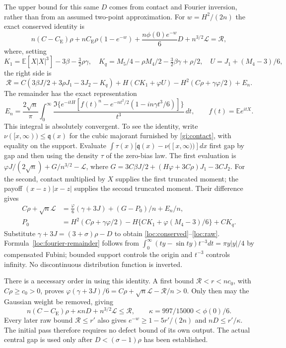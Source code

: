 \documentclass[aop,preprint]{imsart}
\theoremstyle{definition}
\newcommand{\CE}{C_{\mathrm E}}
\newcommand{\E}{\mathbb E}
\numberwithin{equation}{section}
\begin{document}
The upper bound for this same $D$ comes from contact and Fourier
inversion, rather than from an assumed two-point approximation.
For $w=H^2/(2n)$ the exact conserved identity is
\begin{equation}\label{loc:conserved}
 n(C-\CE)\rho+n\CE\rho(1-e^{-w})
 +\frac{n\phi(0)e^{-w}}6D+n^{3/2}\mathcal L=\mathcal R,
\end{equation}
where, setting
\[
 K_1=\E[X|X|^3]-3\beta-\tfrac32\rho\gamma,\quad
 K_q=M_5/4-\rho M_4/2-\tfrac32\beta\gamma+\rho/2,
 \quad U=J_1+(M_4-3)/6,
\]
the right side is
\begin{equation}\label{loc:raw}
 \mathcal R=C(3\beta J/2+3\rho J_1-3J_2-K_q)
 +H(CK_1+\varphi U)-H^2(C\rho+\gamma\varphi/2)+E_n.
\end{equation}
The remainder has the exact representation
\begin{equation}\label{loc:fourier-remainder}
 E_n=\frac{2\sqrt n}{\pi}\int_0^\infty
 \frac{\Im\{e^{-itH}[f(t)^n-e^{-nt^2/2}(1-in\gamma t^3/6)]\}}
 {t^3}\,dt,\qquad f(t)=\E e^{itX}.
\end{equation}
This integral is absolutely convergent.
To see the identity, write $\nu([x,\infty))\le\mathfrak q(x)$ for
the cubic majorant furnished by \eqref{gi:contact}, with equality on
the support. Evaluate
$\int\tau(x)[\mathfrak q(x)-\nu([x,\infty))]dx$ first gap by gap
and then using the density $\tau$ of the zero-bias law.
The first evaluation is
$\varphi J/(2\sqrt n)+G/n^{3/2}-\mathcal L$, where
$G=3C\beta J/2+(H\varphi+3C\rho)J_1-3CJ_2$.
For the second, contact multiplied by $X$ supplies the first truncated
moment; the payoff $(x-z)|x-z|$ supplies the second truncated moment.
Their difference gives
\begin{align*}
 C\rho+\sqrt n\mathcal L
 &=\frac{\varphi}{6}(\gamma+3J)+(G-P_0)/n+E_n/n,\\
 P_0&=H^2(C\rho+\gamma\varphi/2)
      -H\{CK_1+\varphi(M_4-3)/6\}+CK_q.
\end{align*}
Substitute $\gamma+3J=(3+\sigma)\rho-D$ to obtain
\eqref{loc:conserved}--\eqref{loc:raw}.
Formula~\eqref{loc:fourier-remainder} follows from
$\int_0^\infty(ty-\sin ty)t^{-3}dt=\pi y|y|/4$ by compensated
Fubini; bounded support controls the origin and $t^{-3}$ controls
infinity. No discontinuous distribution function is inverted.

There is a necessary order in using this identity. A first bound
$\mathcal R<r<n c_0$, with $C\rho\ge c_0>0$, proves
$\varphi(\gamma+3J)/6=C\rho+\sqrt n\mathcal L-\mathcal R/n>0$.
Only then may the Gaussian weight be removed, giving
\begin{equation}\label{loc:unweighted}
 n(C-\CE)\rho+\kappa nD+n^{3/2}\mathcal L\le\mathcal R,
 \qquad \kappa=997/15000<\phi(0)/6.
\end{equation}
Every later raw bound $\mathcal R\le r'$ also gives
$e^{-w}\ge1-5r'/(2n)$ and $nD\le r'/\kappa$.
The initial pass therefore requires no defect bound of its own output.
The actual central gap is used only after
$D<(\sigma-1)\rho$ has been established.
\end{document}
